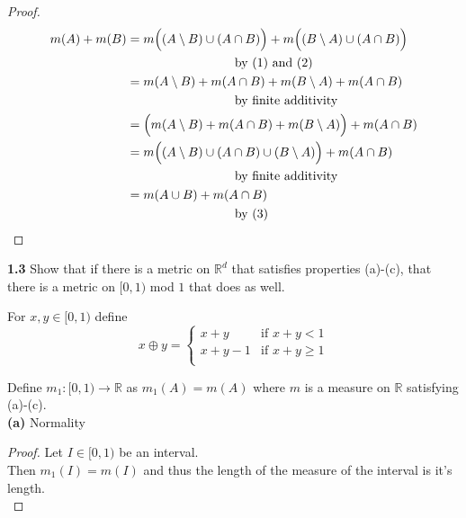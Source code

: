 \documentclass[12pt]{article}
\begin{document}
	\begin{proof}
		\begin{align*}
		m(A) + m(B) & = m\Big((A \setminus B) \cup (A \cap B)\Big) + m\Big((B \setminus A) \cup (A \cap B)\Big) \\
		& \hspace{20 ex} \text{by (1) and (2)} \\
		& = m(A \setminus B) + m(A \cap B) + m(B \setminus A) + m(A \cap B) \\
		& \hspace{20 ex} \text{by finite additivity} \\
		& = \Big( m(A \setminus B) + m(A \cap B) + m(B \setminus A) \Big) +  m(A \cap B) \\
		& = m\Big( (A \setminus B) \cup (A \cap B) \cup (B \setminus A) \Big) +  m(A \cap B)\\
		& \hspace{20 ex}  \text{by finite additivity} \\
		& = m(A \cup B) + m(A \cap B) \\
		& \hspace{20 ex} \text{by (3)}
		\end{align*}
	\end{proof}

\bigbreak

\hspace{-4 ex}\textbf{1.3} Show that if there is a metric on $\mathbb{R}^{d}$ that satisfies properties (a)-(c), that there is a metric on $[0,1)$ mod $1$ that does as well. \bigbreak

For $x,y \in [0,1)$ define 
\[ x \oplus y =
	\begin{cases}
	x + y & \text{if } x+y < 1 \\
	x + y -1 & \text{if } x+y \geq 1\\
	\end{cases}
\]

Define $m_{1}:[0,1) \rightarrow \mathds{R}$ as $m_{1}(A) = m(A)$ where $m$ is a measure on $\mathbb{R}$ satisfying (a)-(c). \\

\hspace{-4 ex}\textbf{(a)} Normality

\begin{proof}
	Let $I \in [0,1)$ be an interval. \\
	Then $m_{1}(I) = m(I)$ and thus the length of the measure of the interval is it's length.\\
\end{proof}
\end{document}
